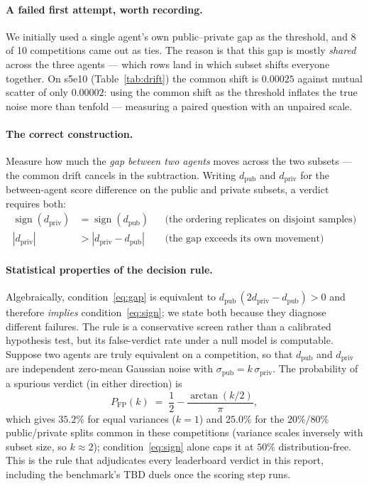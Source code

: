 \documentclass[11pt,a4paper]{article}
\begin{document}
\paragraph{A failed first attempt, worth recording.} We initially used a single agent's own public--private gap as the threshold, and 8 of 10 competitions came out as ties. The reason is that this gap is mostly \emph{shared} across the three agents --- which rows land in which subset shifts everyone together. On s5e10 (Table~\ref{tab:drift}) the common shift is $0.00025$ against mutual scatter of only $0.00002$: using the common shift as the threshold inflates the true noise more than tenfold --- measuring a paired question with an unpaired scale.

\paragraph{The correct construction.} Measure how much the \emph{gap between two agents} moves across the two subsets --- the common drift cancels in the subtraction. Writing $d_{\mathrm{pub}}$ and $d_{\mathrm{priv}}$ for the between-agent score difference on the public and private subsets, a verdict requires both:
\begin{align}
\operatorname{sign}(d_{\mathrm{priv}}) &= \operatorname{sign}(d_{\mathrm{pub}})
  && \text{(the ordering replicates on disjoint samples)} \label{eq:sign} \\
|d_{\mathrm{priv}}| &> |d_{\mathrm{priv}} - d_{\mathrm{pub}}|
  && \text{(the gap exceeds its own movement)} \label{eq:gap}
\end{align}

\paragraph{Statistical properties of the decision rule.} Algebraically, condition~\eqref{eq:gap} is equivalent to $d_{\mathrm{pub}}\,(2d_{\mathrm{priv}} - d_{\mathrm{pub}}) > 0$ and therefore \emph{implies} condition~\eqref{eq:sign}; we state both because they diagnose different failures. The rule is a conservative screen rather than a calibrated hypothesis test, but its false-verdict rate under a null model is computable. Suppose two agents are truly equivalent on a competition, so that $d_{\mathrm{pub}}$ and $d_{\mathrm{priv}}$ are independent zero-mean Gaussian noise with $\sigma_{\mathrm{pub}} = k\,\sigma_{\mathrm{priv}}$. The probability of a spurious verdict (in either direction) is
\begin{equation}
P_{\mathrm{FP}}(k) \;=\; \frac{1}{2} - \frac{\arctan(k/2)}{\pi},
\end{equation}
which gives $35.2\%$ for equal variances ($k=1$) and $25.0\%$ for the $20\%/80\%$ public/private splits common in these competitions (variance scales inversely with subset size, so $k \approx 2$); condition~\eqref{eq:sign} alone caps it at $50\%$ distribution-free. This is the rule that adjudicates every leaderboard verdict in this report, including the benchmark's TBD duels once the scoring step runs.
\end{document}
